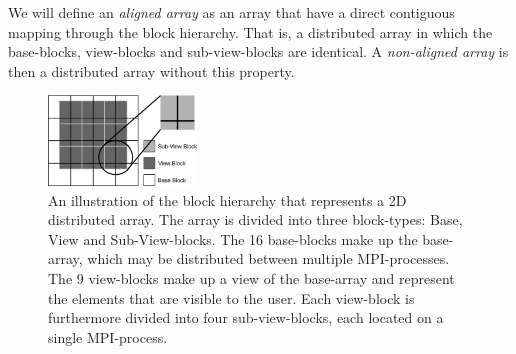 \documentclass[preprint]{../PGAS10/sigplanconf}
\begin{document}



We will define an \emph{aligned array} as an array that have a direct contiguous mapping through the block hierarchy. That is, a distributed array in which the base-blocks, view-blocks and sub-view-blocks are identical. A \emph{non-aligned array} is then a distributed array without this property.

\begin{figure}
 \centering
 \includegraphics[width=150px]{gfx/view_blocks}
 \caption{An illustration of the block hierarchy that represents a 2D distributed array. The array is divided into three block-types: Base, View and Sub-View-blocks. The 16 base-blocks make up the base-array, which may be distributed between multiple MPI-processes. The 9 view-blocks make up a view of the base-array and represent the elements that are visible to the user. Each view-block is furthermore divided into four sub-view-blocks, each located on a single MPI-process.}
 \label{fig:view_block}
\end{figure}
\end{document}
